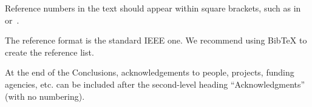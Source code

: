 \documentclass{article}
\begin{document}
Reference numbers in the text should appear within square brackets, such as 
in~\cite{Someone:09} or~\cite{Someone:04,Someone:13}.

The reference format is the standard IEEE one. We recommend using BibTeX to create the reference list.

\begin{acknowledgments}
At the end of the Conclusions, acknowledgements to people, projects, funding agencies, etc. can be included after the second-level heading ``Acknowledgments'' (with no numbering).
\end{acknowledgments} 


\end{document}
